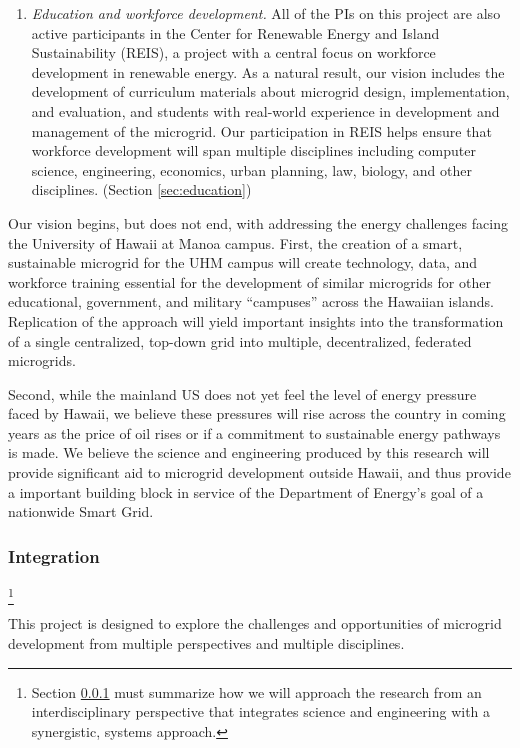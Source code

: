 \begin{enumerate}
\item {\em Education and workforce development.} All of the PIs on this
  project are also active participants in the Center for Renewable Energy
  and Island Sustainability (REIS), a project with a central focus on
  workforce development in renewable energy.  As a natural result, our
  vision includes the development of curriculum materials about microgrid
  design, implementation, and evaluation, and students with real-world
  experience in development and management of the microgrid.  Our participation in REIS
  helps ensure that workforce development will span multiple disciplines
  including computer science, engineering, economics, urban planning, law,
  biology, and other disciplines. (Section \ref{sec:education})

\end{enumerate}

Our vision begins, but does not end, with addressing the energy challenges
facing the University of Hawaii at Manoa campus.  First, the creation of a
smart, sustainable microgrid for the UHM campus will create technology, data,
and workforce training essential for the development of similar microgrids
for other educational, government, and military ``campuses'' across the
Hawaiian islands.  Replication of the approach will yield important
insights into the transformation of a single centralized, top-down
grid into multiple, decentralized, federated microgrids. 

Second, while the mainland US does not yet feel the level of energy
pressure faced by Hawaii, we believe these pressures will rise across the
country in coming years as the price of oil rises or if a commitment to
sustainable energy pathways is made. We believe the science and engineering
produced by this research will provide significant aid to microgrid
development outside Hawaii, and thus provide a important building block in
service of the Department of Energy's goal of a nationwide Smart Grid.

\subsubsection{Integration}
\label{sec:integration}

\footnote{Section \ref{sec:integration} must summarize how we will approach the research from an
  interdisciplinary perspective that integrates science and engineering
  with a synergistic, systems approach.}

This project is designed to explore the challenges and opportunities of
microgrid development from multiple perspectives and multiple disciplines.   

